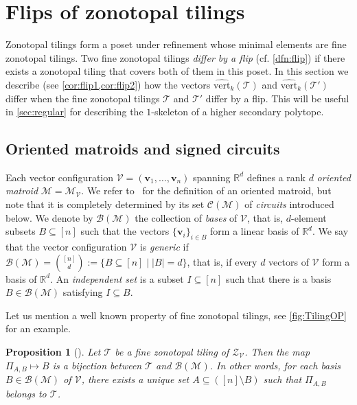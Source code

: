 \documentclass[11pt]{amsart}
\theoremstyle{plain}
\newtheorem{proposition}[theorem]{Proposition}
\theoremstyle{definition}
\def\R{\mathbb{R}}
\def\v{{\bm{v}}}
\def\V{\mathcal{V}}
\def\Zon{\mathcal{Z}}
\def\ZV{\Zon_\V}
\newcommand\wh[1]{\hstretch{2}{\hat{\hstretch{0.5}{#1}}}}
\def\vert{\mathrm{vert}}
\def\vertHSP{\wh\vert}
\def\vertHSP{\widehat{\vert}}
\def\VC{\V}
\def\Bcal{\mathcal{B}}
\def\Ccal{\mathcal{C}}
\def\Mcal{\mathcal{M}}
\def\Tcal{\mathcal{T}}
\def\suppC{{\underline{C}}}
\def\Tiling{\Tcal}
\def\tile{\Pi}
\let\subset\subseteq
\begin{document}
\section{Flips of zonotopal tilings}\label{sec:flips-zonot-tilings}
Zonotopal tilings form a poset under refinement whose minimal elements are fine zonotopal tilings. Two fine zonotopal tilings \emph{differ by a flip} (cf. \cref{dfn:flip}) if there exists a zonotopal tiling that covers both of them in this poset.  
In this section we describe 
(see \cref{cor:flip1,cor:flip2}) 
how the vectors 
$\vertHSP_k(\Tiling)$ and $\vertHSP_k(\Tiling')$
differ when the 
 fine zonotopal tilings  $\Tiling$ and $\Tiling'$ differ by a flip.  
This will be useful in \cref{sec:regular} for describing
the $1$-skeleton of a higher secondary polytope.


\def\Bases{\Bcal(\Mcal)}
\def\Circuits{\Ccal(\Mcal)}
\def\sC^#1{\suppC^{(#1)}}
\def\setmin#1#2{#1^{(#2)}}
\def\BMC{\Bcal(\Mcal/\suppC)}

\subsection{Oriented matroids and signed circuits}

Each vector configuration $\VC=(\v_1,\dots,\v_n)$ spanning $\R^d$ defines a
rank $d$ \emph{oriented matroid} $\Mcal=\Mcal_\VC$. We refer to~\cite{RedBook} for the definition of an oriented matroid, but note that it is completely determined by its set $\Circuits$ of \emph{circuits} introduced below. We denote by $\Bases$ the collection of \emph{bases} of $\VC$, that is, 
$d$-element subsets $B\subset [n]$ such that the vectors $\{\v_i\}_{i\in B}$ form a linear basis of $\R^d$. We say that the vector configuration $\VC$ is \emph{generic} if $\Bases={[n]\choose d}:=\{B\subset [n]\mid |B|=d\}$, that is, if every $d$ vectors of $\VC$ form a basis of $\R^d$. An \emph{independent set} is a subset $I\subset [n]$ such that there is a basis $B\in\Bases$ satisfying $I\subset B$.


Let us mention a well known property of fine zonotopal tilings, see \cref{fig:TilingOP} for an example.
\begin{proposition}[{\cite[(56)]{Shephard}}]\label{prop:bases_bijection}
Let $\Tiling$ be a fine zonotopal tiling of $\ZV$. Then the map $\tile_{A,B}\mapsto B$ is a bijection between $\Tiling$ and $\Bases$. In other words, for each basis $B\in\Bases$ of $\VC$, there exists a unique set $A\subset([n]\setminus B)$ such that $\tile_{A,B}$ belongs to $\Tiling$.
\end{proposition}
\end{document}
